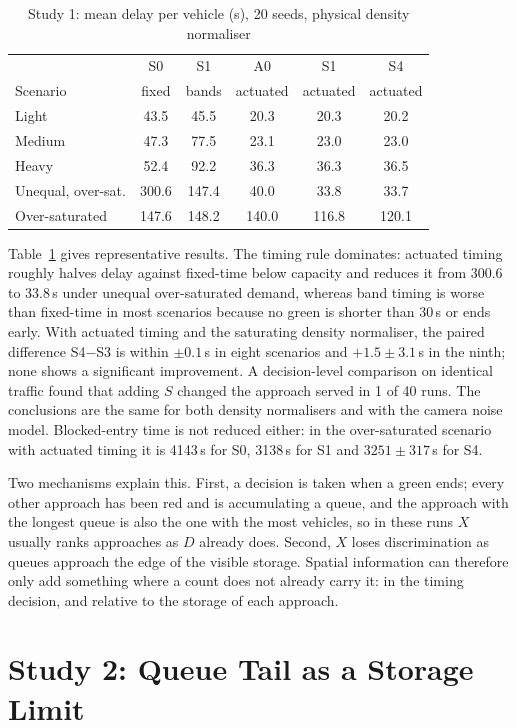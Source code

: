 \documentclass[journal]{IEEEtran}
\begin{document}
\begin{table}[t]
\caption{Study 1: mean delay per vehicle (s), 20 seeds, physical density normaliser}
\label{tab:study1}
\centering
\begin{tabular}{lccccc}
\toprule
 & S0 & S1 & A0 & S1 & S4\\
Scenario & fixed & bands & actuated & actuated & actuated\\
\midrule
Light & 43.5 & 45.5 & 20.3 & 20.3 & 20.2\\
Medium & 47.3 & 77.5 & 23.1 & 23.0 & 23.0\\
Heavy & 52.4 & 92.2 & 36.3 & 36.3 & 36.5\\
Unequal, over-sat. & 300.6 & 147.4 & 40.0 & 33.8 & 33.7\\
Over-saturated & 147.6 & 148.2 & 140.0 & 116.8 & 120.1\\
\bottomrule
\end{tabular}
\end{table}

Table~\ref{tab:study1} gives representative results. The timing rule dominates: actuated
timing roughly halves delay against fixed-time below capacity and reduces it from 300.6
to 33.8\,s under unequal over-saturated demand, whereas band timing is worse than
fixed-time in most scenarios because no green is shorter than 30\,s or ends early. With actuated timing and the saturating density normaliser, the paired difference S4$-$S3 is within $\pm0.1$\,s in eight scenarios and $+1.5\pm3.1$\,s in the ninth; none shows a significant improvement. A decision-level comparison on identical traffic found that adding $S$
changed the approach served in 1 of 40 runs. The conclusions are the same for both
density normalisers and with the camera noise model. Blocked-entry time is not reduced
either: in the over-saturated scenario with actuated timing it is 4143\,s for S0, 3138\,s for S1 and
$3251\pm317$\,s for S4.

Two mechanisms explain this. First, a decision is taken when a green ends; every other
approach has been red and is accumulating a queue, and the approach with the longest
queue is also the one with the most vehicles, so in these runs $X$ usually ranks approaches as $D$ already does. Second,
$X$ loses discrimination as queues approach the edge of the visible storage. Spatial information can
therefore only add something where a count does not already carry it: in the timing
decision, and relative to the storage of each approach.

\section{Study 2: Queue Tail as a Storage Limit}\label{sec:study2}
\end{document}
